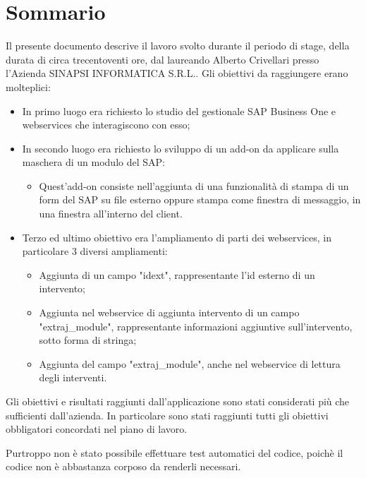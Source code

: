 
\cleardoublepage
{}
{}
\begingroup
\let\clearpage\relax
\let\cleardoublepage\relax
\let\cleardoublepage\relax

\chapter*{Sommario}

Il presente documento descrive il lavoro svolto durante il periodo di stage, della durata di circa trecentoventi ore, dal laureando Alberto Crivellari presso l'Azienda SINAPSI INFORMATICA S.R.L..
Gli obiettivi da raggiungere erano molteplici:
\begin{itemize}
    \item In primo luogo era richiesto lo studio del gestionale SAP Business One e webservices che interagiscono con esso;
    \item In secondo luogo era richiesto lo sviluppo di un add-on da applicare sulla maschera di un modulo del SAP:
        \begin{itemize}
            \item Quest'add-on consiste nell'aggiunta di una funzionalità di stampa di un form del SAP su file esterno oppure stampa come finestra di messaggio, in una finestra all'interno del client.
        \end{itemize}
    \item Terzo ed ultimo obiettivo era l'ampliamento di parti dei webservices, in particolare 3 diversi ampliamenti:
        \begin{itemize}
            \item Aggiunta di un campo "idext", rappresentante l'id esterno di un intervento;
            \item Aggiunta nel webservice di aggiunta intervento di un campo "extraj\_module", rappresentante informazioni aggiuntive sull'intervento, sotto forma di stringa;
            \item Aggiunta del campo "extraj\_module", anche nel webservice di lettura degli interventi.
        \end{itemize}
\end{itemize}


Gli obiettivi e risultati raggiunti dall'applicazione sono stati considerati più che sufficienti dall'azienda.
In particolare sono stati raggiunti tutti gli obiettivi obbligatori concordati nel piano di lavoro.

Purtroppo non è stato possibile effettuare test automatici del codice, poichè il codice non è abbastanza corposo da renderli necessari.
%
%

\endgroup			

\vfill

